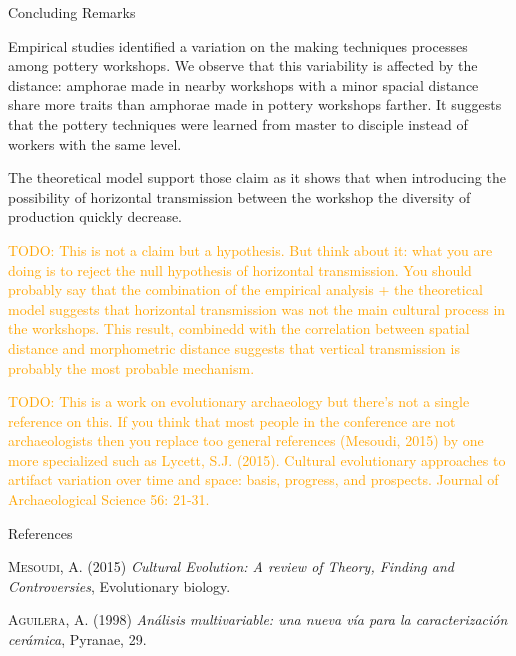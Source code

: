 \documentclass[final]{beamer}
\newlength{\onecolwid}
\newcommand{\memo}[2]{\textcolor{#1}{#2}}
\newcommand{\xavi}[1]{\memo{orange}{TODO: #1\\}}
\begin{document}
\begin{frame}[t]
\begin{columns}[t]
\begin{column}{\onecolwid} %

\begin{block}{Concluding Remarks}

Empirical studies identified a variation on the making techniques processes among pottery workshops. We observe that this variability is affected by the distance: amphorae made in nearby workshops with a minor spacial distance share more traits than amphorae made in pottery workshops farther. It suggests that the pottery techniques were learned from master to disciple instead of workers with the same level. 



The theoretical model support those claim as it shows that when introducing the possibility of horizontal transmission between the workshop the diversity of production quickly decrease.

\xavi{This is not a claim but a hypothesis. But think about it: what you are doing is to reject the null hypothesis of horizontal transmission. You should probably say that the combination of the empirical analysis + the theoretical model suggests that horizontal transmission was not the main cultural process in the workshops. This result, combinedd with the correlation between spatial distance and morphometric distance suggests that vertical transmission is probably the most probable mechanism.}

\xavi{This is a work on evolutionary archaeology but there's not a single reference on this. If you think that most people in the conference are not archaeologists then you replace too general references (Mesoudi, 2015) by one more specialized such as Lycett, S.J. (2015). Cultural evolutionary approaches to artifact variation over time and space: basis, progress, and prospects. Journal of Archaeological Science 56: 21-31.}

 
\end{block}

\begin{block}{References}
\small

\begin{thebibliography}{50}

\textsc{Mesoudi, A. (2015)}
\textit{Cultural Evolution: A review of Theory, Finding and Controversies}, Evolutionary biology.

\textsc{Aguilera, A. (1998)}
\textit{An\'alisis multivariable: una nueva v\'ia para la caracterizaci\'on cer\'amica}, Pyranae, 29.


\end{thebibliography}
\end{block}
\end{column}
\end{columns}
\end{frame}
\end{document}

